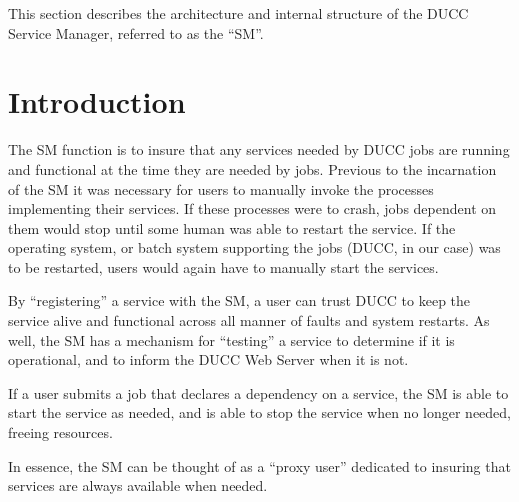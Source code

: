 % 
% 
% 
% 

    This section describes the architecture and internal structure of the
    DUCC Service Manager, referred to as the ``SM''.

\section{Introduction}
    The SM function is to insure that any services needed by
    DUCC jobs are running and functional at the time they are needed by
    jobs.  Previous to the incarnation of the SM it was necessary for
    users to manually invoke the processes implementing their services.  If
    these processes were to crash, jobs dependent on them would stop until
    some human was able to restart the service.  If the operating system,
    or batch system supporting the jobs (DUCC, in our case) was to
    be restarted, users would again have to manually start the services.

    By ``registering'' a service with the SM, a user can trust DUCC to
    keep the service alive and functional across all manner of faults and
    system restarts.  As well, the SM has a mechanism for ``testing'' a
    service to determine if it is operational, and to inform the DUCC
    Web Server when it is not.  

    If a user submits a job that declares a dependency on a service, the SM
    is able to start the service as needed, and is able to stop the service
    when no longer needed, freeing resources.

    In essence, the SM can be thought of as a ``proxy user'' dedicated
    to insuring that services are always available when needed.

